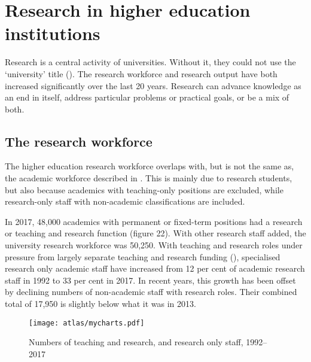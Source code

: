 \documentclass{grattan}
\begin{document}
%
\chapter{Research in higher education institutions }\label{chap:research-in-higher-education-institutions}

Research is a central activity of universities. Without it, they could not use the `university' title (). The research workforce and research output have both increased significantly over the last 20 years. Research can advance knowledge as an end in itself, address particular problems or practical goals, or be a mix of both.

%
\section{The research workforce}\label{sec:the-research-workforce}

The higher education research workforce overlaps with, but is not the same as, the academic workforce described in . This is mainly due to research students, but also because academics with teaching-only positions are excluded, while research-only staff with non-academic classifications are included.

In 2017, 48,000 academics with permanent or fixed-term positions had a research or teaching and research function (figure 22). With other research staff added, the university research workforce was 50,250. With teaching and research roles under pressure from largely separate teaching and research funding (), specialised research only academic staff have increased from 12 per cent of academic research staff in 1992 to 33 per cent in 2017. In recent years, this growth has been offset by declining numbers of non-academic staff with research roles. Their combined total of 17,950 is slightly below what it was in 2013.


    \begin{figure} %
    \caption{Numbers of teaching and research, and research only staff, 1992--2017}\label{fig:numbers-of-teaching-and-research-and-research-only-staff-19922017}
    \texttt{[image: atlas/mycharts.pdf]}
    \end{figure}
\end{document}
